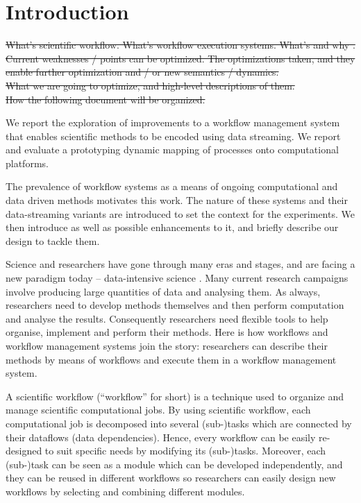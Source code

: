 \chapter{Introduction}
\sout{What's scientific workflow. What's workflow execution systems. What's \dpy and why \dpy. Current weaknesses / points can be optimized. The optimizations taken, and they enable further optimization and / or new semantics / dynamics. \\
What we are going to optimize, and high-level descriptions of them. \\
How the following document will be organized.}

We report the exploration of improvements to a workflow management system that enables scientific methods to be encoded using data streaming. We report and evaluate a prototyping dynamic mapping of processes onto computational platforms.

The prevalence of workflow systems as a means of ongoing computational and data driven methods motivates this work. The nature of these systems and their data-streaming variants are introduced to set the context for the experiments. We then introduce \dpy as well as possible enhancements to it, and briefly describe our design to tackle them.

Science and researchers have gone through many eras and stages, and are facing a new paradigm today -- data-intensive science \cite{hey2009fourth}. Many current research campaigns involve producing large quantities of data and analysing them. As always, researchers need to develop methods themselves and then perform computation and analyse the results. Consequently researchers need flexible tools to help organise, implement and perform their methods. Here is how workflows and workflow management systems join the story: researchers can describe their methods by means of workflows and execute them in a workflow management system.

A scientific workflow (``workflow'' for short) is a technique used to organize and manage scientific computational jobs. By using scientific workflow, each computational job is decomposed into several (sub-)tasks which are connected by their dataflows (data dependencies). Hence, every workflow can be easily re-designed to suit specific needs by modifying its (sub-)tasks. Moreover, each (sub-)task can be seen as a module which can be developed independently, and they can be reused in different workflows so researchers can easily design new workflows by selecting and combining different modules.

